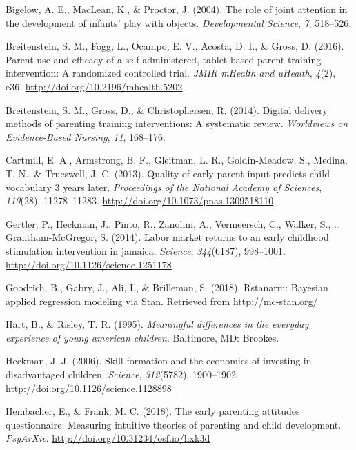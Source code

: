 \documentclass[man,floatsintext]{apa6}
\begin{document}
\leavevmode\hypertarget{ref-Bigelow2004}{}%
Bigelow, A. E., MacLean, K., \& Proctor, J. (2004). The role of joint attention in the development of infants' play with objects. \emph{Developmental Science}, \emph{7}, 518--526.

\leavevmode\hypertarget{ref-Breitenstein2016}{}%
Breitenstein, S. M., Fogg, L., Ocampo, E. V., Acosta, D. I., \& Gross, D. (2016). Parent use and efficacy of a self-administered, tablet-based parent training intervention: A randomized controlled trial. \emph{JMIR mHealth and uHealth}, \emph{4}(2), e36. \url{http://doi.org/10.2196/mhealth.5202}

\leavevmode\hypertarget{ref-Breitenstein2014}{}%
Breitenstein, S. M., Gross, D., \& Christophersen, R. (2014). Digital delivery methods of parenting training interventions: A systematic review. \emph{Worldviews on Evidence-Based Nursing}, \emph{11}, 168--176.

\leavevmode\hypertarget{ref-Cartmill2013}{}%
Cartmill, E. A., Armstrong, B. F., Gleitman, L. R., Goldin-Meadow, S., Medina, T. N., \& Trueswell, J. C. (2013). Quality of early parent input predicts child vocabulary 3 years later. \emph{Proceedings of the National Academy of Sciences}, \emph{110}(28), 11278--11283. \url{http://doi.org/10.1073/pnas.1309518110}

\leavevmode\hypertarget{ref-Jamaica2014}{}%
Gertler, P., Heckman, J., Pinto, R., Zanolini, A., Vermeersch, C., Walker, S., \ldots{} Grantham-McGregor, S. (2014). Labor market returns to an early childhood stimulation intervention in jamaica. \emph{Science}, \emph{344}(6187), 998--1001. \url{http://doi.org/10.1126/science.1251178}

\leavevmode\hypertarget{ref-rstanarm}{}%
Goodrich, B., Gabry, J., Ali, I., \& Brilleman, S. (2018). Rstanarm: Bayesian applied regression modeling via Stan. Retrieved from \url{http://mc-stan.org/}

\leavevmode\hypertarget{ref-Hart1995}{}%
Hart, B., \& Risley, T. R. (1995). \emph{Meaningful differences in the everyday experience of young american children}. Baltimore, MD: Brookes.

\leavevmode\hypertarget{ref-Heckman2006}{}%
Heckman, J. J. (2006). Skill formation and the economics of investing in disadvantaged children. \emph{Science}, \emph{312}(5782), 1900--1902. \url{http://doi.org/10.1126/science.1128898}

\leavevmode\hypertarget{ref-Hembacher2018}{}%
Hembacher, E., \& Frank, M. C. (2018). The early parenting attitudes questionnaire: Measuring intuitive theories of parenting and child development. \emph{PsyArXiv}. \url{http://doi.org/10.31234/osf.io/hxk3d}
\end{document}
